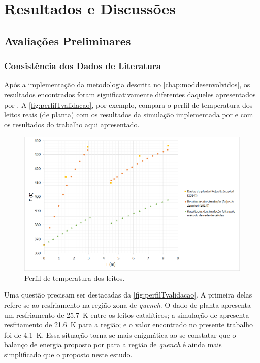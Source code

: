 %
% 
%
\chapter{Resultados e Discussões} \label{chap:resultados}

\section{Avaliações Preliminares} \label{sec:avaliacoesespreliminares}

\subsection{Consistência dos Dados de Literatura}
\label{sec:dadosliteratura}

Após a implementação da metodologia descrita no \autoref{chap:moddesenvolvidos},
os resultados encontrados foram significativamente diferentes daqueles apresentados
por . A \autoref{fig:perfilTvalidacao}, por
exemplo, compara o perfil de temperatura dos leitos reais (de planta) com os
resultados da simulação implementada por  e com os
resultados do trabalho aqui apresentado.

\begin{figure}[htb]
\centering \includegraphics[scale=0.4]{images/Chap4/perfilTvalidacao.png}
\caption{Perfil de temperatura dos leitos.}
\label{fig:perfilTvalidacao}
\end{figure}

Uma questão precisam ser destacadas da \autoref{fig:perfilTvalidacao}.
A primeira delas refere-se ao resfriamento na região zona de \emph{quench}. O
dado de planta apresenta um resfriamento de \SI{25,7}{K} entre os leitos
catalíticos; a simulação de  apresenta resfriamento de
\SI{21,6}{K} para a região; e o valor encontrado no
presente trabalho foi de \SI{4,1}{K}. Essa situação torna-se mais enigmática ao
se constatar que o balanço de energia proposto por  para
a região de \emph{quench} é ainda mais simplificado que o proposto neste estudo.


